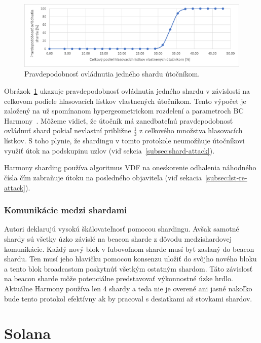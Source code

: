 \begin{figure}[bt]
	\centering
	\includegraphics[width=\textwidth]{obrazky-figures/hypergeom-dist}
	\caption{Pravdepodobnosť ovládnutia jedného shardu útočníkom.}
	\label{img:hypergeom-dist}
\end{figure}

Obrázok~\ref{img:hypergeom-dist} ukazuje pravdepodobnosť ovládnutia jedného shardu v závislosti na celkovom podiele hlasovacích lístkov vlastnených útočníkom. Tento výpočet je založený na už spomínanom hypergeometrickom rozdelení a parametroch BC Harmony~\cite{harmonyWp}. Môžeme vidieť, že útočník má zanedbateľnú pravdepodobnosť ovládnuť shard pokiaľ nevlastní približne $\frac{1}{3}$ z celkového množstva hlasovacích lístkov. S toho plynie, že shardingu v tomto protokole neumožňuje útočníkovi využiť útok na podskupinu uzlov (viď sekcia~\ref{subsec:shard-attack}).

Harmony sharding používa algoritmus VDF na oneskorenie odhalenia náhodného čísla čím zabraňuje útoku na posledného objaviteľa (viď sekacia~\ref{subsec:lst-re-attack}).

\subsection{Komunikácie medzi shardami}
Autori deklarujú vysokú škálovateľnosť pomocou shardingu. Avšak samotné shardy sú všetky úzko závislé na beacon sharde z dôvodu medzishardovej komunikácie. Každý nový blok v ľubovoľnom sharde musí byť zaslaný do beacon shardu. Ten musí jeho hlavičku pomocou konsenzu uložiť do svôjho nového bloku a tento blok broadcastom poskytnúť všetkým ostatným shardom. Táto závislosť na beacon sharde môže potenciálne predstavovať výkonnostné úzke hrdlo. Aktuálne Harmony používa len 4 shardy a teda nie je overené ani jasné nakoľko bude tento protokol efektívny ak by pracoval s desiatkami až stovkami shardov.

\chapter{Solana}

